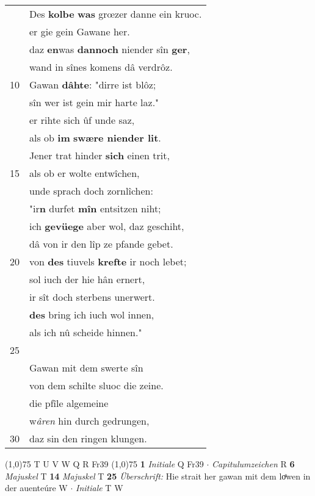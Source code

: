 \documentclass[8pt,a4paper,notitlepage]{article}
\begin{document}
\begin{table}[ht]
\begin{minipage}[t]{0.5\linewidth}
\begin{tabular}{rl}
 & Des \textbf{kolbe} \textbf{was} grœzer danne ein kruoc.\\ 
 & er gie gein Gawane her.\\ 
 & daz \textbf{en}was \textbf{dannoch} niender sîn \textbf{ger},\\ 
 & wand in sînes komens dâ verdrôz.\\ 
10 & Gawan \textbf{dâhte}: "dirre ist blôz;\\ 
 & sîn wer ist gein mir harte laz."\\ 
 & er rihte sich ûf unde saz,\\ 
 & als ob \textbf{im} \textbf{swære niender lit}.\\ 
 & Jener trat hinder \textbf{sich} einen trit,\\ 
15 & als ob er wolte entwîchen,\\ 
 & unde sprach doch zornlîchen:\\ 
 & "ir\textbf{n} durfet \textbf{mîn} entsitzen niht;\\ 
 & ich \textbf{gevüege} aber wol, daz geschiht,\\ 
 & dâ von ir den lîp ze pfande gebet.\\ 
20 & von \textbf{des} tiuvels \textbf{krefte} ir noch lebet;\\ 
 & sol iuch der hie hân ernert,\\ 
 & ir sît doch sterbens unerwert.\\ 
 & \textbf{des} bring ich iuch wol innen,\\ 
 & als ich nû scheide hinnen."\\ 
25 & \textit{\begin{large}D\end{large}}er vilân trat wider în.\\ 
 & Gawan mit dem swerte sîn\\ 
 & von dem schilte sluoc die zeine.\\ 
 & die pfîle algemeine\\ 
 & w\textit{âren} hin durch gedrungen,\\ 
30 & daz sin den ringen klungen.\\ 
\end{tabular}
\scriptsize
\line(1,0){75} \newline
T U V W Q R Fr39 \newline
\line(1,0){75} \newline
\textbf{1} \textit{Initiale} Q Fr39   $\cdot$ \textit{Capitulumzeichen} R  \textbf{6} \textit{Majuskel} T  \textbf{14} \textit{Majuskel} T  \textbf{25} \textit{Überschrift:} Hie strait her gawan mit dem loͤwen in der auenteúre W   $\cdot$ \textit{Initiale} T W  \newline

\end{minipage}
\end{table}
\end{document}
